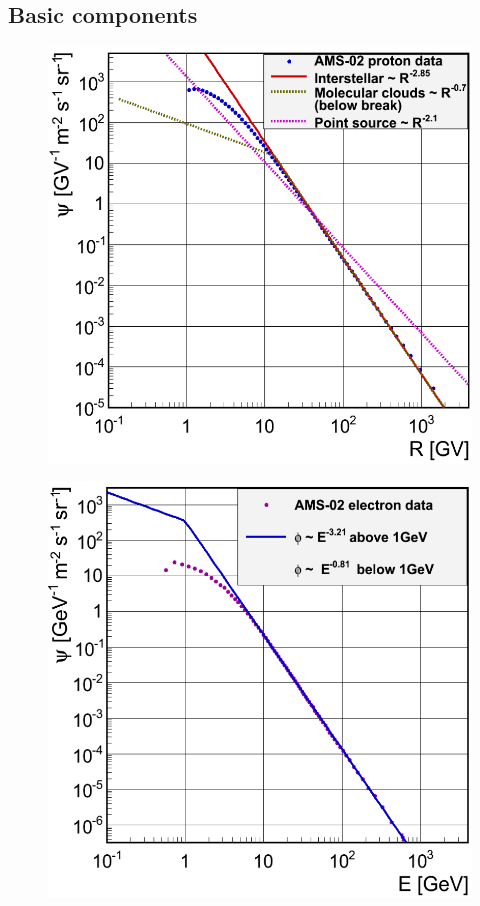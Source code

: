 \subsection{Basic components}

\begin{figure}[h]
  \centering
  \begin{minipage}[h]{0.45\textwidth}
  	\centering
	\includegraphics[width=1.\linewidth]{pic/method/proton_shapes.png}
  	\subcaption{}
 	\label{fig:proton_spec}
  \end{minipage}
  \hfill
  \begin{minipage}[h]{0.45\textwidth}
	  \centering
	  \includegraphics[width=1.\linewidth]{pic/method/el_shapes.png}

\end{minipage}
\end{figure}
